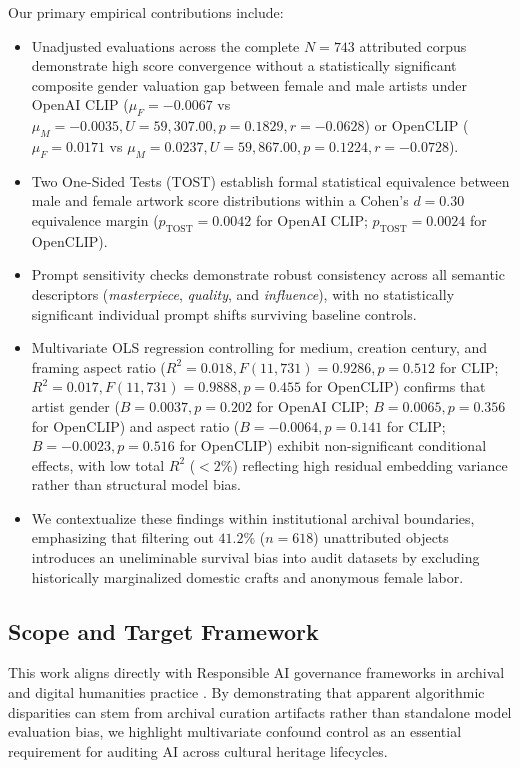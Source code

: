 \documentclass[pdflatex,sn-mathphys-num]{sn-jnl}%
\theoremstyle{thmstyleone}%
\theoremstyle{thmstyletwo}%
\theoremstyle{thmstylethree}%
\begin{document}
Our primary empirical contributions include:
\begin{itemize}
    \item Unadjusted evaluations across the complete $N=743$ attributed corpus demonstrate high score convergence without a statistically significant composite gender valuation gap between female and male artists under OpenAI CLIP ($\mu_F = -0.0067$ vs $\mu_M = -0.0035, U = 59,307.00, p = 0.1829, r = -0.0628$) or OpenCLIP ($\mu_F = 0.0171$ vs $\mu_M = 0.0237, U = 59,867.00, p = 0.1224, r = -0.0728$).
    \item Two One-Sided Tests (TOST) establish formal statistical equivalence between male and female artwork score distributions within a Cohen's $d = 0.30$ equivalence margin ($p_{\text{TOST}} = 0.0042$ for OpenAI CLIP; $p_{\text{TOST}} = 0.0024$ for OpenCLIP).
    \item Prompt sensitivity checks demonstrate robust consistency across all semantic descriptors (\textit{masterpiece}, \textit{quality}, and \textit{influence}), with no statistically significant individual prompt shifts surviving baseline controls.
    \item Multivariate OLS regression controlling for medium, creation century, and framing aspect ratio ($R^2 = 0.018, F(11, 731) = 0.9286, p = 0.512$ for CLIP; $R^2 = 0.017, F(11, 731) = 0.9888, p = 0.455$ for OpenCLIP) confirms that artist gender ($B = 0.0037, p = 0.202$ for OpenAI CLIP; $B = 0.0065, p = 0.356$ for OpenCLIP) and aspect ratio ($B = -0.0064, p = 0.141$ for CLIP; $B = -0.0023, p = 0.516$ for OpenCLIP) exhibit non-significant conditional effects, with low total $R^2$ ($<2\%$) reflecting high residual embedding variance rather than structural model bias.
    \item We contextualize these findings within institutional archival boundaries, emphasizing that filtering out $41.2\%$ ($n=618$) unattributed objects introduces an uneliminable survival bias into audit datasets by excluding historically marginalized domestic crafts and anonymous female labor.
\end{itemize}

\subsection{Scope and Target Framework}
This work aligns directly with Responsible AI governance frameworks in archival and digital humanities practice \cite{dignum2019responsible, stahl2021responsible, mitchell2019model, jobin2019global}. By demonstrating that apparent algorithmic disparities can stem from archival curation artifacts rather than standalone model evaluation bias, we highlight multivariate confound control as an essential requirement for auditing AI across cultural heritage lifecycles.
\end{document}
